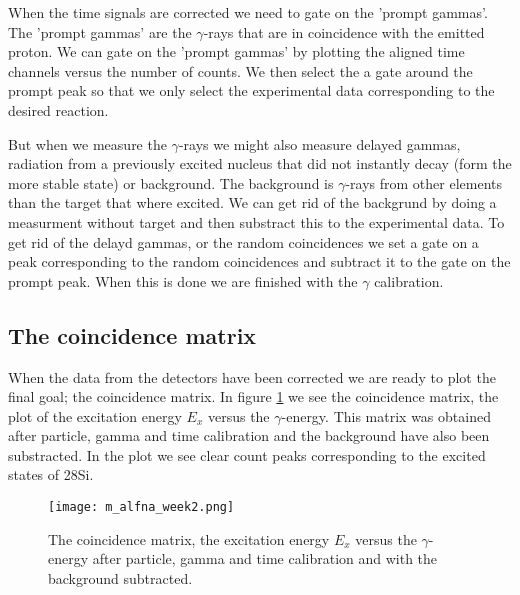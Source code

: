 \documentclass[11pt,a4wide]{article}
\begin{document}
When the time signals are corrected we need to gate on the 'prompt gammas'. The 'prompt gammas' are the $\gamma$-rays that are in coincidence with the emitted proton. We can gate on the 'prompt gammas' by plotting the aligned time channels versus the number of counts. We then select the a  gate around the prompt peak so that we only select the experimental data corresponding to the desired reaction. 

But when we measure the $\gamma$-rays we might also measure delayed gammas, radiation from a previously excited nucleus that did not instantly decay (form the more stable state) or background. The background is $\gamma$-rays from other elements than the target that where excited. We can get rid of the backgrund by doing a measurment without target and then substract this to the experimental data. To get rid of the delayd gammas, or the random coincidences we set a gate on a peak corresponding to the random coincidences and subtract it to the gate on the prompt peak. When this is done we are finished with the $\gamma$ calibration.


\subsection{ The coincidence matrix}
When the data from the detectors have been corrected we are ready to plot the final goal; the coincidence matrix. In figure \ref{fig: coincidence} we see the coincidence matrix, the plot of the excitation energy $E_x$ versus the $\gamma$-energy. This matrix was obtained after particle, gamma and time calibration and the background have also been substracted. In the plot we see clear count peaks corresponding to the excited states of 28Si. 

\begin{figure}[h!]
\centering
\texttt{[image: m\_alfna\_week2.png]}
\caption{The coincidence matrix, the excitation energy $E_x$ versus the $\gamma$-energy after particle, gamma and time calibration and with the background subtracted. }
\label{fig: coincidence}
\end{figure}
\end{document}
